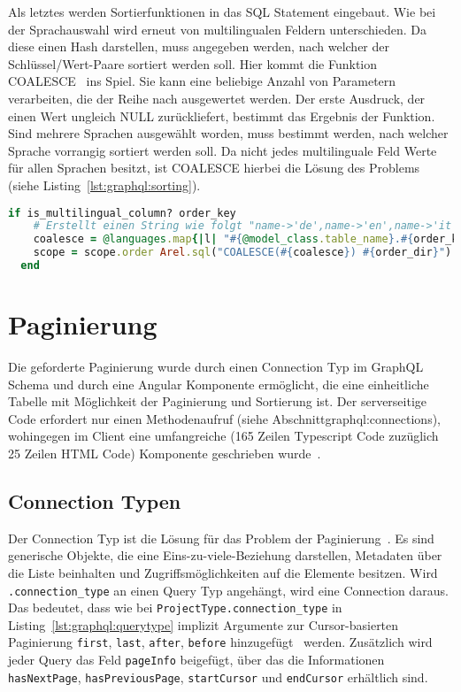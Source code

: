 Als letztes werden Sortierfunktionen in das SQL Statement eingebaut. Wie bei der Sprachauswahl wird erneut von multilingualen Feldern unterschieden.
Da diese einen Hash darstellen, muss angegeben werden, nach welcher der Schlüssel/Wert-Paare sortiert werden soll. Hier kommt die Funktion COALESCE~\cite{coalesce-postgres} ins Spiel. Sie kann eine beliebige Anzahl von Parametern verarbeiten, die der Reihe nach ausgewertet werden. Der erste Ausdruck, der einen Wert ungleich NULL zurückliefert, bestimmt das Ergebnis der Funktion. Sind mehrere Sprachen ausgewählt worden, muss bestimmt werden, nach welcher Sprache vorrangig sortiert werden soll. Da nicht jedes multilinguale Feld Werte für allen Sprachen besitzt, ist COALESCE hierbei die Lösung des Problems (siehe Listing~\ref{lst:graphql:sorting}).

\begin{lstlisting}[language=Ruby,float=h!,caption={Sortieren von Feldern in der Klasse BaseResolver}, label={lst:graphql:sorting}] 
  if is_multilingual_column? order_key
    # Erstellt einen String wie folgt "name->'de',name->'en',name->'it',name->'fr'"
    coalesce = @languages.map{|l| "#{@model_class.table_name}.#{order_key}->'#{l}'"}.join(',')
    scope = scope.order Arel.sql("COALESCE(#{coalesce}) #{order_dir}")
  end
\end{lstlisting}

\section{Paginierung}
\label{impl:pagination}
Die geforderte Paginierung wurde durch einen Connection Typ im GraphQL Schema und durch eine Angular Komponente ermöglicht, die eine einheitliche Tabelle mit Möglichkeit der Paginierung und Sortierung ist.
Der serverseitige Code erfordert nur einen Methodenaufruf (siehe Abschnitt{graphql:connections}), wohingegen im Client eine umfangreiche (165 Zeilen Typescript Code zuzüglich 25 Zeilen HTML Code) Komponente geschrieben wurde~\cite{paginator-table}.

\subsection{Connection Typen}
\label{graphql:connections}
Der Connection Typ ist die Lösung für das Problem der Paginierung~\cite{graphql-connection-concept}.
Es sind generische Objekte, die eine Eins-zu-viele-Beziehung darstellen, Metadaten über die Liste beinhalten und Zugriffsmöglichkeiten auf die Elemente besitzen.
Wird \texttt{.con\-nection\-\_type} an einen Query Typ angehängt, wird eine Connection daraus. 
Das bedeutet, dass wie bei \texttt{ProjectType.connection\_type} in Listing~\ref{lst:graphql:querytype} implizit Argumente zur Cursor-basierten Paginierung \texttt{first}, \texttt{last}, \texttt{after}, \texttt{before} hinzugefügt~\cite{graphql-relay-connection} werden. Zusätzlich wird jeder Query das Feld \texttt{pageInfo} beigefügt, über das die Informationen \texttt{hasNextPage}, \texttt{hasPreviousPage}, \texttt{startCursor} und \texttt{endCursor} erhältlich sind. 

